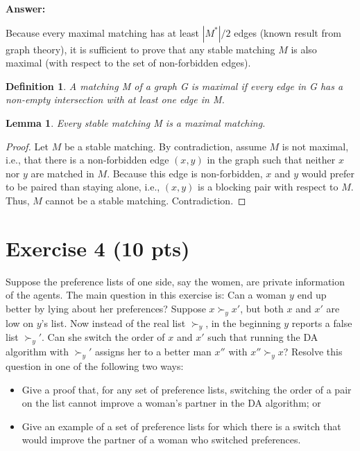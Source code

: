 \documentclass{article}
\newtheorem{mylemma}{\textbf{Lemma}}
\newtheorem{mydefinition}{Definition}
\begin{document}
\bigskip \noindent \textbf{Answer:}

Because every maximal matching has at least $|M^*|/2$ edges (known result from graph theory), it is sufficient to prove
that any stable matching $M$ is also maximal (with respect to the set of non-forbidden edges).

\begin{mydefinition}
A matching M of a graph G is maximal if every edge in G has a non-empty intersection with at least one edge in M.
\end{mydefinition}

\begin{mylemma}
Every stable matching M is a maximal matching.
\end{mylemma}
\begin{proof}
Let $M$ be a stable matching. By contradiction, assume $M$ is not maximal, i.e., that there is a non-forbidden edge $(x,y)$ in the graph such that neither $x$ nor $y$ are matched in $M$. Because this edge is non-forbidden, $x$ and $y$ would prefer to be paired than staying alone, i.e., $(x,y)$ is a blocking pair with respect to $M$. Thus, $M$ cannot be a stable matching. Contradiction.
\end{proof}

\section{Exercise 4 (10 pts)}

Suppose the preference lists of one side, say the women, are private information of the agents. The main question in this exercise is: Can a woman $y$ end up better by lying about her preferences? Suppose $x \succ_y x'$, but both $x$ and $x'$ are low on $y$'s list. Now instead of the real list $\succ_y$, in the beginning $y$ reports a false list $\succ_y'$. Can she switch the order of $x$ and $x'$ such that running the DA algorithm with $\succ_y'$ assigns her to a better man $x''$ with $x'' \succ_y x$? Resolve this question in one of the following two ways:

\begin{itemize}
\item Give a proof that, for any set of preference lists, switching the order of a pair on the list cannot improve a woman's partner in the DA algorithm; or
\item Give an example of a set of preference lists for which there is a switch that would improve the partner of a woman who switched preferences.
\end{itemize}
\end{document}
